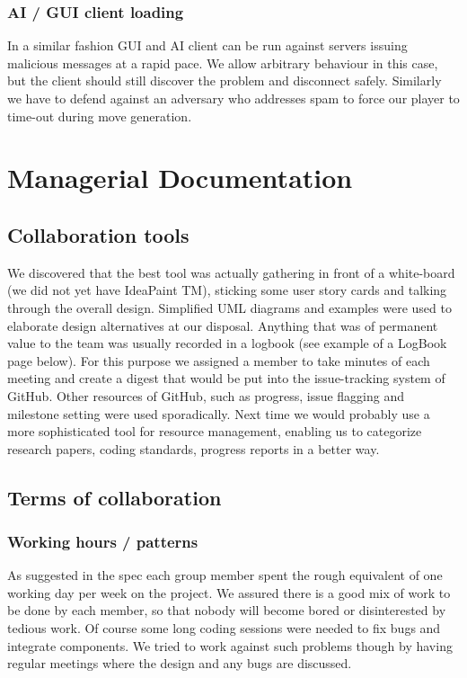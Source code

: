\documentclass[11pt]{article}
\begin{document}
\subsubsection{AI / GUI client loading}

In a similar fashion GUI and AI client can be run against servers issuing 
malicious messages at a rapid pace. We allow arbitrary behaviour in this
case, but the client should still discover the problem and disconnect 
safely. Similarly we have to defend against an adversary who addresses spam
to force our player to time-out during move generation.   

\section{Managerial Documentation}

\subsection{Collaboration tools}
We discovered that the best tool was actually gathering in front of a
white-board (we did not yet have IdeaPaint TM), sticking some user story
cards and talking through the overall design. Simplified UML diagrams and
examples were used to elaborate design alternatives at our disposal. Anything
that was of permanent value to the team was usually recorded in a logbook
(see example of a LogBook page below). For this purpose we assigned a member
to take minutes of each meeting and create a digest that would be put into
the issue-tracking system of GitHub. Other resources of GitHub, such as
progress, issue flagging and milestone setting were used sporadically. Next 
time we would probably use a more sophisticated tool for resource management,
enabling us to categorize research papers, coding standards, progress 
reports in a better way.

\subsection{Terms of collaboration}

\subsubsection{Working hours / patterns}
As suggested in the spec each group member spent the rough equivalent
of one working day per week on the project. We assured there is a
good mix of work to be done by each member, so that nobody will become
bored or disinterested by tedious work. Of course some long coding sessions
were needed to fix bugs and integrate components. We tried to work against
such problems though by having regular meetings where the design and
any bugs are discussed. 
\end{document}
